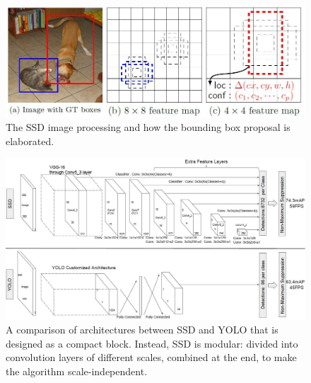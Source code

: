 \begin{figure}[!h]
\centering
\includegraphics[width=0.8\linewidth]{images/howItWorks_ssd}
\caption{The SSD image processing and how the bounding box proposal is elaborated.}
\label{fig:howItWorks_ssd}
\end{figure}
\begin{figure}[!h]
\centering
\includegraphics[width=1\linewidth]{images/architecture_ssdVSyolo}
\caption{A comparison of architectures between SSD and YOLO that is designed as a compact block. Instead, SSD is modular: divided into convolution layers of different scales, combined at the end, to make the algorithm scale-independent.}
\label{fig:architecture_ssdVSyolo}
\end{figure}



